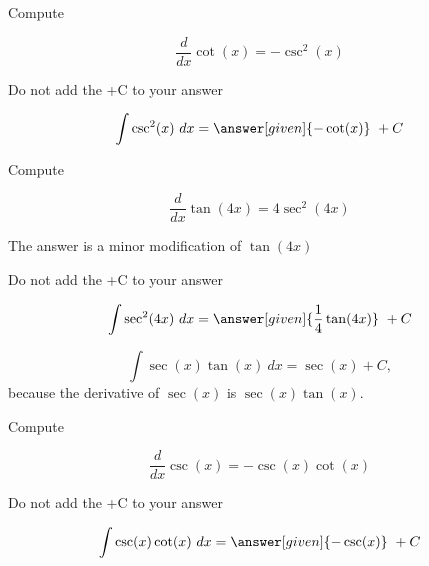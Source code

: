 \documentclass{ximera}
\begin{document}
\begin{problem} %
Compute 

\begin{hint}
\[
\frac{d}{dx} \cot(x) = -\csc^2(x)
\]
\end{hint}
\begin{hint}
\begin{center}
Do not add the +C to your answer
\end{center}
\end{hint}

\[
\int \csc^2(x) \ dx =
\answer[given]{-\cot(x)} \ + C
\]
\end{problem}

\begin{problem} %
Compute 

\begin{hint}
\[
\frac{d}{dx} \tan(4x) = 4\sec^2(4x)
\]
\end{hint}
\begin{hint}
The answer is a minor modification of $\tan(4x)$
\end{hint}
\begin{hint}
\begin{center}
Do not add the +C to your answer
\end{center}
\end{hint}

\[
\int \sec^2(4x) \ dx =
\answer[given]{\frac14\tan(4x)} \ + C
\]
\end{problem}

\begin{example} %
\[
\int \sec(x)\tan(x) \ dx = \sec(x) + C,
\]
because the derivative of $\sec(x)$ is $\sec(x)\tan(x)$.

\end{example}


\begin{problem} %
Compute 

\begin{hint}
\[
\frac{d}{dx} \csc(x) = -\csc(x)\cot(x)
\]
\end{hint}
\begin{hint}
\begin{center}
Do not add the +C to your answer
\end{center}
\end{hint}

\[
\int \csc(x)\cot(x) \ dx =
\answer[given]{-\csc(x)} \ + C
\]
\end{problem}
\end{document}
